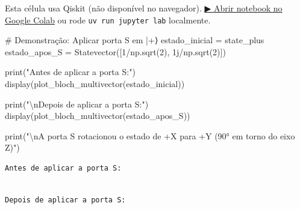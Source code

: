 \documentclass[
  brazilian,
]{report}
\newenvironment{Shaded}{\begin{snugshade}}{\end{snugshade}}
\newcommand{\BuiltInTok}[1]{\textcolor[rgb]{0.00,0.23,0.31}{#1}}
\newcommand{\CharTok}[1]{\textcolor[rgb]{0.13,0.47,0.30}{#1}}
\newcommand{\CommentTok}[1]{\textcolor[rgb]{0.37,0.37,0.37}{#1}}
\newcommand{\DecValTok}[1]{\textcolor[rgb]{0.68,0.00,0.00}{#1}}
\newcommand{\NormalTok}[1]{\textcolor[rgb]{0.00,0.23,0.31}{#1}}
\newcommand{\OperatorTok}[1]{\textcolor[rgb]{0.37,0.37,0.37}{#1}}
\newcommand{\OtherTok}[1]{\textcolor[rgb]{0.00,0.23,0.31}{#1}}
\newcommand{\StringTok}[1]{\textcolor[rgb]{0.13,0.47,0.30}{#1}}
\begin{document}
\begin{tcolorbox}[enhanced jigsaw, arc=.35mm, bottomrule=.15mm, bottomtitle=1mm, breakable, colback=white, colbacktitle=quarto-callout-warning-color!10!white, colframe=quarto-callout-warning-color-frame, coltitle=black, left=2mm, leftrule=.75mm, opacityback=0, opacitybacktitle=0.6, rightrule=.15mm, title=\textcolor{quarto-callout-warning-color}{\faExclamationTriangle}\hspace{0.5em}{⚛️ Célula Qiskit --- execute no Colab ou localmente}, titlerule=0mm, toprule=.15mm, toptitle=1mm]

Esta célula usa Qiskit (não disponível no navegador).
\href{https://colab.research.google.com/github/maxwellamaral/aula-quantum/blob/main/notebooks/00b-phases.ipynb}{▶
Abrir notebook no Google Colab} ou rode \texttt{uv\ run\ jupyter\ lab}
localmente.

\begin{Shaded}
\begin{Highlighting}[]

\CommentTok{\# Demonstração: Aplicar porta S em |+⟩}
\NormalTok{estado\_inicial }\OperatorTok{=}\NormalTok{ state\_plus}
\NormalTok{estado\_apos\_S }\OperatorTok{=}\NormalTok{ Statevector([}\DecValTok{1}\OperatorTok{/}\NormalTok{np.sqrt(}\DecValTok{2}\NormalTok{), }\OtherTok{1j}\OperatorTok{/}\NormalTok{np.sqrt(}\DecValTok{2}\NormalTok{)])}

\BuiltInTok{print}\NormalTok{(}\StringTok{"Antes de aplicar a porta S:"}\NormalTok{)}
\NormalTok{display(plot\_bloch\_multivector(estado\_inicial))}

\BuiltInTok{print}\NormalTok{(}\StringTok{"}\CharTok{\textbackslash{}n}\StringTok{Depois de aplicar a porta S:"}\NormalTok{)}
\NormalTok{display(plot\_bloch\_multivector(estado\_apos\_S))}

\BuiltInTok{print}\NormalTok{(}\StringTok{"}\CharTok{\textbackslash{}n}\StringTok{A porta S rotacionou o estado de +X para +Y (90° em torno do eixo Z)"}\NormalTok{)}
\end{Highlighting}
\end{Shaded}

\end{tcolorbox}

\begin{verbatim}
Antes de aplicar a porta S:
\end{verbatim}

\begin{verbatim}

Depois de aplicar a porta S:
\end{verbatim}
\end{document}
